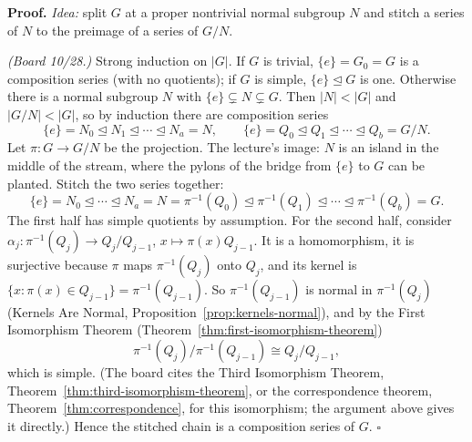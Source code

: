 \documentclass[11pt]{report}
\renewenvironment{proof}[1][Proof]{\noindent\textbf{#1.} }{\hfill$\square$\par\vspace{5pt}}
\begin{document}
\begin{proof}
\textit{Idea:} split $G$ at a proper nontrivial normal subgroup $N$ and stitch a series of $N$ to the preimage of a series of $G/N$.\par
\textit{(Board 10/28.)} Strong induction on $|G|$. If $G$ is trivial, $\{e\} = G_0 = G$ is a composition series (with no quotients); if $G$ is simple, $\{e\} \trianglelefteq G$ is one. Otherwise there is a normal subgroup $N$ with $\{e\} \subsetneq N \subsetneq G$. Then $|N| < |G|$ and $|G/N| < |G|$, so by induction there are composition series
\[ \{e\} = N_0 \trianglelefteq N_1 \trianglelefteq \cdots \trianglelefteq N_a = N, \qquad \{e\} = Q_0 \trianglelefteq Q_1 \trianglelefteq \cdots \trianglelefteq Q_b = G/N. \]
Let $\pi: G \to G/N$ be the projection. The lecture's image: $N$ is an island in the middle of the stream, where the pylons of the bridge from $\{e\}$ to $G$ can be planted. Stitch the two series together:
\[ \{e\} = N_0 \trianglelefteq \cdots \trianglelefteq N_a = N = \pi^{-1}(Q_0) \trianglelefteq \pi^{-1}(Q_1) \trianglelefteq \cdots \trianglelefteq \pi^{-1}(Q_b) = G. \]
The first half has simple quotients by assumption. For the second half, consider $\alpha_j: \pi^{-1}(Q_j) \to Q_j/Q_{j-1}$, $x \mapsto \pi(x)Q_{j-1}$. It is a homomorphism, it is surjective because $\pi$ maps $\pi^{-1}(Q_j)$ onto $Q_j$, and its kernel is $\{x : \pi(x) \in Q_{j-1}\} = \pi^{-1}(Q_{j-1})$. So $\pi^{-1}(Q_{j-1})$ is normal in $\pi^{-1}(Q_j)$ (Kernels Are Normal, Proposition~\ref{prop:kernels-normal}), and by the First Isomorphism Theorem (Theorem~\ref{thm:first-isomorphism-theorem})
\[ \pi^{-1}(Q_j)/\pi^{-1}(Q_{j-1}) \cong Q_j/Q_{j-1}, \]
which is simple. (The board cites the Third Isomorphism Theorem, Theorem~\ref{thm:third-isomorphism-theorem}, or the correspondence theorem, Theorem~\ref{thm:correspondence}, for this isomorphism; the argument above gives it directly.) Hence the stitched chain is a composition series of $G$.
\end{proof}
\end{document}

